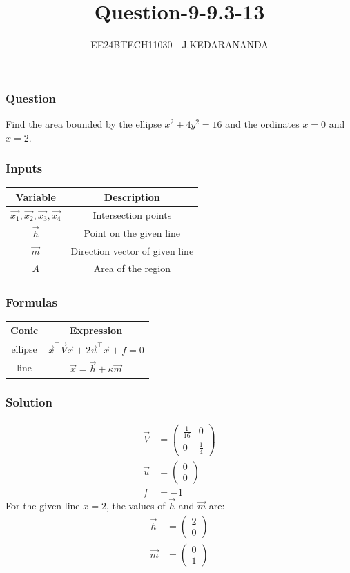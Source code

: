 \documentclass{beamer}
\title{Question-9-9.3-13}
\author{EE24BTECH11030 - J.KEDARANANDA}
\date{}
\begin{document}
\frame{\titlepage}

\begin{frame}
\frametitle{Question}
Find the area bounded by the ellipse $x^2 + 4y^2 = 16$ and the ordinates $x = 0$ and $x = 2$.
\end{frame}

\begin{frame}
\frametitle{Inputs}

\centering
\begin{tabular}{ |c|c|}
    \hline
    \textbf{Variable} & \textbf{Description}\\ 
    \hline
    $\vec{x_1},\vec{x_2},\vec{x_3},\vec{x_4}$ & Intersection points\\
    \hline
    $\vec{h}$ & Point on the given line\\
    \hline
    $\vec{m}$ & Direction vector of given line\\
    \hline
    $A$ & Area of the region\\
    \hline
\end{tabular}
\end{frame}

\begin{frame}
\frametitle{Formulas}
\centering
\begin{tabular}{ |c|c|}
    \hline
    \textbf{Conic} & \textbf{Expression}\\ 
    \hline
    ellipse & $\vec{x}^\top\vec{V}\vec{x} + 2\vec{u}^\top\vec{x} + f = 0$\\
    \hline
    line & $\vec{x}=\vec{h}+\kappa\vec{m}$\\
    \hline
\end{tabular}
\end{frame}

\begin{frame}
\frametitle{Solution}
\begin{align}
\vec{V}&=\begin{pmatrix}\frac{1}{16} & 0\\0 & \frac{1}{4}\end{pmatrix}\\
\vec{u}&=\begin{pmatrix}0\\0\end{pmatrix}\\
f&=-1
\end{align}
For the given line $x=2$, the values of $\vec{h}$ and $\vec{m}$ are:
\begin{align}
\vec{h}&=\begin{pmatrix}2\\0\end{pmatrix}\\
\vec{m}&=\begin{pmatrix}0\\1\end{pmatrix}
\end{align}
\end{frame}
\end{document}
